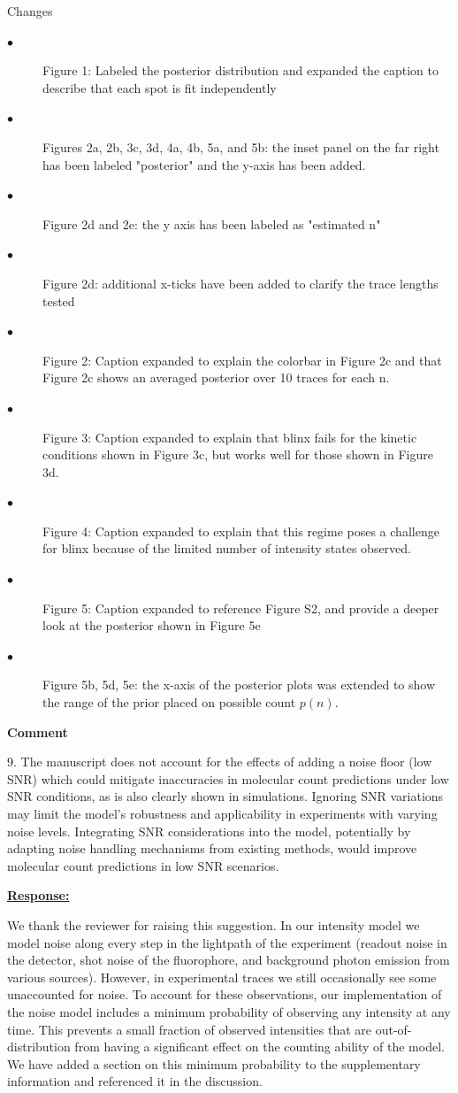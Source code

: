 \documentclass{article}
\begin{document}
Changes
\begin{description}
    \item[$\bullet$] Figure 1: Labeled the posterior distribution and expanded the caption
    to describe that each spot is fit independently
    \item[$\bullet$] Figures 2a, 2b, 3c, 3d, 4a, 4b, 5a, and 5b: the inset panel on the 
    far right has been labeled "posterior" and the y-axis has been added.
    \item[$\bullet$] Figure 2d and 2e: the y axis has been labeled as "estimated n"
    \item[$\bullet$] Figure 2d: additional x-ticks have been added to clarify the trace 
    lengths tested
    \item[$\bullet$] Figure 2: Caption expanded to explain the colorbar in Figure 2c and 
    that Figure 2c shows an averaged posterior over 10 traces for each n.
    \item[$\bullet$] Figure 3: Caption expanded to explain that blinx fails for the kinetic 
    conditions shown in Figure 3c, but works well for those shown in Figure 3d.
    \item[$\bullet$] Figure 4: Caption expanded to explain that this regime poses a challenge 
    for blinx because of the limited number of intensity states observed.
    \item[$\bullet$] Figure 5: Caption expanded to reference Figure S2, and provide a deeper 
    look at the posterior shown in Figure 5e
    \item[$\bullet$] Figure 5b, 5d, 5e: the x-axis of the posterior plots was extended to 
    show the range of the prior placed on possible count $p(n)$.
\end{description}

\textbf{Comment}

9.	The manuscript does not account for the effects of adding a noise floor (low SNR) 
which could mitigate inaccuracies in molecular count predictions under low SNR conditions, 
as is also clearly shown in simulations. Ignoring SNR variations may limit the model's 
robustness and applicability in experiments with varying noise levels. Integrating SNR 
considerations into the model, potentially by adapting noise handling mechanisms from 
existing methods, would improve molecular count predictions in low SNR scenarios.

\underline{\textbf{Response:}}

We thank the reviewer for raising this suggestion. In our intensity model we model noise along every step in the 
lightpath of the experiment (readout noise in the detector, shot noise of the fluorophore, and
background photon emission from various sources). However, in experimental traces we still occasionally see some 
unaccounted for noise. To account for these observations, our implementation 
of the noise model includes a minimum probability of observing any intensity 
at any time. This prevents a small fraction of observed intensities that are out-of-distribution 
from having a significant effect on the counting ability of the model. We have added a section on this minimum 
probability to the supplementary information and referenced it in the discussion.
\end{document}
